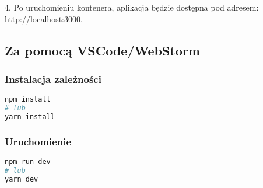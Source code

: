 \documentclass[12pt,a4paper]{article}
\begin{document}
4. Po uruchomieniu kontenera, aplikacja będzie dostępna pod adresem: \url{http://localhost:3000}.

\subsection{Za pomocą VSCode/WebStorm}
\subsubsection{Instalacja zależności}
\begin{lstlisting}[language=bash]
npm install
# lub
yarn install
\end{lstlisting}

\subsubsection{Uruchomienie}
\begin{lstlisting}[language=bash]
npm run dev
# lub
yarn dev
\end{lstlisting}
\end{document}
